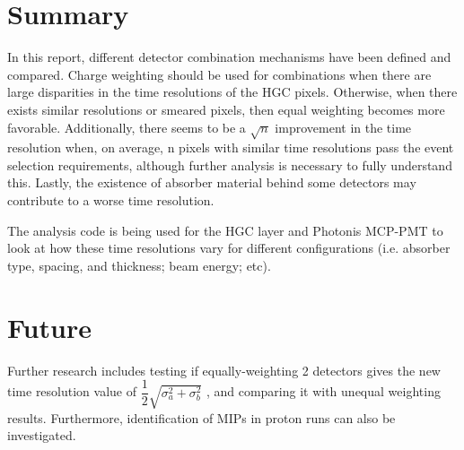 \documentclass[twocolumn,aps,prd,reprint,superscriptaddress,floatfix]{revtex4-1}
\begin{document}
\section{Summary}
In this report, different detector combination mechanisms have been defined and compared.
Charge weighting should be used for combinations when there are large disparities in the time resolutions of the HGC pixels.
Otherwise, when there exists similar resolutions or smeared pixels, then equal weighting becomes more favorable.
Additionally, there seems to be a $\sqrt{n}$ improvement in the time resolution when, on average, n pixels with similar time resolutions pass the event selection requirements, although further analysis is necessary to fully understand this.
Lastly, the existence of absorber material behind some detectors may contribute to a worse time resolution.

The analysis code is being used for the HGC layer and Photonis MCP-PMT to look at how these time resolutions vary for different configurations (i.e. absorber type, spacing, and thickness; beam energy; etc). 

\section{Future}
Further research includes testing if equally-weighting 2 detectors gives the new time resolution value of 
$
\dfrac{1}{2} \sqrt{\sigma_a^2+\sigma_b^2}
$
, and comparing it with unequal weighting results.
Furthermore, identification of MIPs in proton runs can also be investigated. 
\end{document}
